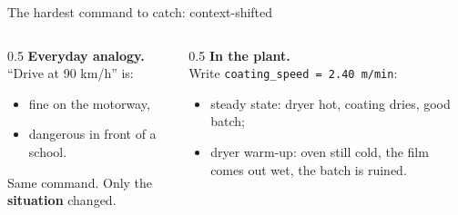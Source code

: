\documentclass[aspectratio=169]{beamer}
\newcommand{\key}[1]{\textcolor{accent}{\textbf{#1}}}
\begin{document}
\begin{frame}{The hardest command to catch: context-shifted}
\begin{columns}[T]
\begin{column}{0.5\textwidth}
\textbf{Everyday analogy.}\\[0.3em]
``Drive at 90 km/h'' is:
\begin{itemize}
  \item fine on the \textcolor{good}{motorway},
  \item dangerous in front of a \textcolor{bad}{school}.
\end{itemize}
\vspace{0.6em}
Same command. Only the \key{situation} changed.
\end{column}
\begin{column}{0.5\textwidth}
\textbf{In the plant.}\\[0.3em]
Write \texttt{coating\_speed = 2.40 m/min}:
\begin{itemize}
  \item \textcolor{good}{steady state}: dryer hot, coating dries, good batch;
  \item \textcolor{bad}{dryer warm-up}: oven still cold, the film comes out
        wet, the batch is ruined.
\end{itemize}
\end{column}
\end{columns}
\vspace{0.6em}
\begin{center}
\end{center}
\end{frame}
\end{document}
